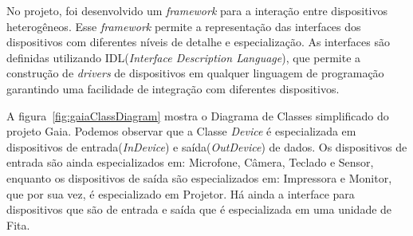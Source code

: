 No projeto, foi desenvolvido um \emph{framework} para a interação entre dispositivos heterogêneos. Esse \emph{framework} permite a representação das interfaces dos dispositivos com diferentes níveis de detalhe e especialização. As interfaces são definidas utilizando IDL(\emph{Interface Description Language}), que permite a construção de \emph{drivers} de dispositivos em qualquer linguagem de programação garantindo uma facilidade de integração com diferentes dispositivos.

A figura~\ref{fig:gaiaClassDiagram} mostra o Diagrama de Classes simplificado do projeto Gaia. Podemos observar que a Classe \emph{Device} é especializada em dispositivos de entrada(\emph{InDevice}) e saída(\emph{OutDevice}) de dados. Os dispositivos de entrada são ainda especializados em: Microfone, Câmera, Teclado e Sensor, enquanto os dispositivos de saída são especializados em: Impressora e Monitor, que por sua vez, é especializado em Projetor. Há ainda a interface para dispositivos que são de entrada e saída que é especializada em uma unidade de Fita.

